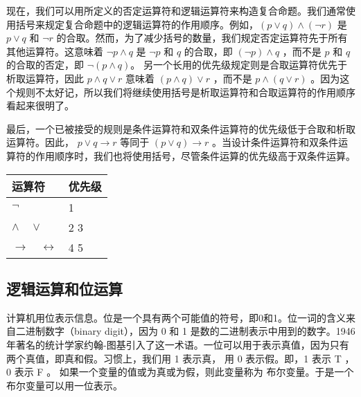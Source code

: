 现在，我们可以用所定义的否定运算符和逻辑运算符来构造复合命题。我们通常使用括号来规定复合命题中的逻辑运算符的作用顺序。例如，$(p \lor q) \land (\neg r)$ 是 $p \lor q$ 和 $\neg r$ 的合取。然而，为了减少括号的数量，我们规定否定运算符先于所有其他运算符。这意味着 $\neg p \land q$ 是 $\neg p$ 和 $q$ 的合取，即 $(\neg p) \land q$ ，而不是 $p$ 和 $q$ 的合取的否定，即 $\neg(p \land q)$。   
另一个长用的优先级规定则是合取运算符优先于析取运算符，因此 $p \land q \lor r$ 意味着 $(p \land q) \lor r$ ，而不是 $p \land (q \lor r)$ 。因为这个规则不太好记，所以我们将继续使用括号是析取运算符和合取运算符的作用顺序看起来很明了。  

最后，一个已被接受的规则是条件运算符和双条件运算符的优先级低于合取和析取运算符。因此， $p \lor q \to r$ 等同于 $(p \lor q) \to r$ 。当设计条件运算符和双条件运算符的作用顺序时，我们也将使用括号，尽管条件运算的优先级高于双条件运算。

\begin{table}
	\begin{tabular}{l|l}
		\hline
		运算符 & 优先级 \\
		\hline
		$\neg$	& 1 \\
		$\land \quad \lor$ & 2 3 \\
		$\to \quad \leftrightarrow$ & 4 5 \\
		\hline
	\end{tabular}
\end{table}


\subsection{逻辑运算和位运算}

计算机用位表示信息。位是一个具有两个可能值的符号，即0和1。位一词的含义来自二进制数字（binary digit），因为 0 和 1 是数的二进制表示中用到的数字。1946 年著名的统计学家约翰-图基引入了这一术语。一位可以用于表示真值，因为只有两个真值，即真和假。习惯上，我们用 1 表示真， 用 0 表示假。即，1 表示 T ， 0 表示 F 。 如果一个变量的值或为真或为假，则此变量称为 布尔变量。于是一个布尔变量可以用一位表示。


